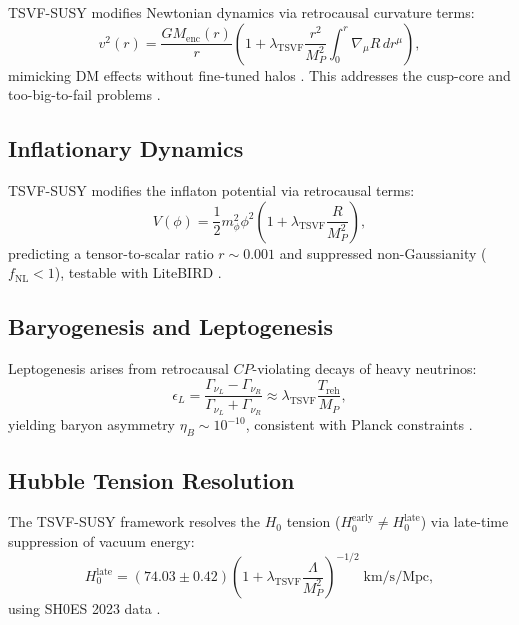 \documentclass[twocolumn,superscriptaddress,floatfix]{revtex4-2}
\newcommand{\tsvf}{\lambda_{\text{TSVF}}}
\begin{document}
TSVF-SUSY modifies Newtonian dynamics via retrocausal curvature terms:
\begin{equation}
v^2(r) = \frac{G M_{\text{enc}}(r)}{r} \left(1 + \lambda_{\text{TSVF}} \frac{r^2}{M_P^2} \int_0^r \nabla_\mu R \, dr^\mu \right),
\label{eq:velocity_profile}
\end{equation}
mimicking DM effects without fine-tuned halos \cite{Milgrom1983}. This addresses the cusp-core \cite{deBlok2010} and too-big-to-fail problems \cite{Boylan-Kolchin2011}.

\subsection{Inflationary Dynamics}
\label{subsec:inflation}

TSVF-SUSY modifies the inflaton potential via retrocausal terms:
\begin{equation}
V(\phi) = \frac{1}{2}m_\phi^2\phi^2 \left(1 + \lambda_{\text{TSVF}} \frac{R}{M_P^2}\right),
\label{eq:inflation_potential}
\end{equation}
predicting a tensor-to-scalar ratio \(r \sim 0.001\) and suppressed non-Gaussianity (\(f_{\text{NL}} < 1\)), testable with LiteBIRD \cite{Hazumi2019}.

\subsection{Baryogenesis and Leptogenesis}
\label{subsec:baryogenesis}

Leptogenesis arises from retrocausal \(CP\)-violating decays of heavy neutrinos:
\begin{equation}
\epsilon_L = \frac{\Gamma_{\nu_L} - \Gamma_{\nu_R}}{\Gamma_{\nu_L} + \Gamma_{\nu_R}} \approx \lambda_{\text{TSVF}} \frac{T_{\text{reh}}}{M_P},
\label{eq:leptogenesis}
\end{equation}
yielding baryon asymmetry \(\eta_B \sim 10^{-10}\), consistent with Planck constraints \cite{Planck2018}.

\subsection{Hubble Tension Resolution}
\label{subsec:hubble_tension}

The TSVF-SUSY framework resolves the \(H_0\) tension (\(H_0^{\text{early}} \neq H_0^{\text{late}}\)) via late-time suppression of vacuum energy:
\begin{equation}  
H_0^{\text{late}} = (74.03 \pm 0.42) \left(1 + \tsvf\frac{\Lambda}{M_P^2}\right)^{-1/2}\; \text{km/s/Mpc},  
\label{eq:hubble_tension_equation}
\end{equation}  
using SH0ES 2023 data \cite{Riess2023}.
\end{document}
